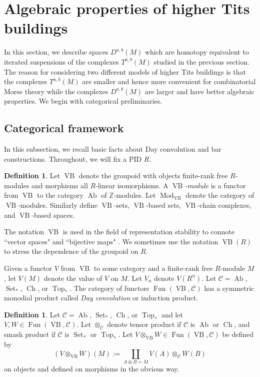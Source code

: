 \documentclass[a4paper]{amsart}
\DeclareMathOperator{\Mod}{Mod}
\DeclareMathOperator{\VB}{VB}
\DeclareMathOperator{\Ch}{Ch}
\DeclareMathOperator{\Ab}{Ab}
\DeclareMathOperator{\Top}{Top}
\DeclareMathOperator{\Set}{Set}
\DeclareMathOperator{\Fun}{Fun}
\newcommand{\cC}{\mathcal{C}}\newcommand{\cD}{\mathcal{D}}
\newcommand{\Z}{\mathbb{Z}}
\numberwithin{theoremcounter}{section}
\theoremstyle{definition}
\newtheorem{definition}[Defauto]{Definition}
\theoremstyle{remark}
\begin{document}
\section{Algebraic properties of higher Tits buildings}


In this section, we describe spaces $D^{a,b}(M)$ which are homotopy equivalent to iterated suspensions of the complexes $T^{a,b}(M)$ studied in the previous section. The reason for considering two different models of higher Tits buildings is that the complexes $T^{a,b}(M)$ are smaller and hence more convenient for combinatorial Morse theory while the complexes $D^{a,b}(M)$ are larger and have better algebraic properties. We begin with categorical preliminaries.

\subsection{Categorical framework} 
 
In this subsection, we recall basic facts about Day convolution and bar constructions. Throughout, we will fix a PID $R$.

\begin{definition}

Let $\VB$ denote the groupoid with objects finite-rank free $R$-modules and morphisms all $R$-linear isomorphisms.  A \emph{$\VB$-module} is a functor from $\VB$ to the category $\Ab$ of $\Z$-modules. Let $\Mod_{\VB}$ denote the category of $\VB$-modules. Similarly define $\VB$-sets, $\VB$-based sets, $\VB$-chain complexes, and $\VB$-based spaces.
\end{definition}

The notation $\VB$ is used in the field of representation stability to connote ``vector spaces" and ``bijective maps" \cite{PutmanSam}. We sometimes use the notation $\VB(R)$ to stress the dependence of the groupoid on $R$.


Given a functor $V$ from $\VB$ to some category and a finite-rank free $R$-module $M$, let $V(M)$ denote the value of $V$ on $M$. Let $V_n$ denote $V(R^n)$. Let $\cC=\Ab$, ${\Set_*}$, $\Ch$, or ${\Top_*}$.  The category of functors $\Fun(\VB,\cC)$ has a symmetric monodial product called \emph{Day convolution} or induction product. 



\begin{definition} \label{Day}
 Let $\cC= \Ab$, ${\Set_*}$, $\Ch$, or ${\Top_*}$ and let $V,W \in \Fun(\VB,\cC)$. Let $\otimes_{\cC}$ denote tensor product if $\cC$ is $\Ab$ or $\Ch$, and smash product if $\cC$  is ${\Set_*}$ or ${\Top_*}$.   Let $V \otimes_{\VB} W \in \Fun(\VB,\cC)$ be defined by  
 $$(V \otimes_{\VB} W)(M):= \coprod_{A \oplus B=M} V(A) \otimes_{\cC} W(B)$$ on objects and defined on morphisms in the obvious way.
\end{definition}
\end{document}
